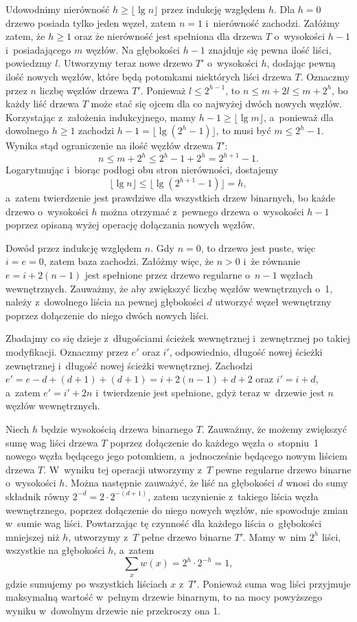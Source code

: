 \exercise %
Udowodnimy nierówność $h\ge\lfloor\lg n\rfloor$ przez indukcję względem $h$. Dla $h=0$ drzewo posiada tylko jeden węzeł, zatem $n=1$ i~nierówność zachodzi. Załóżmy zatem, że $h\ge1$ oraz że nierówność jest spełniona dla drzewa $T$ o~wysokości $h-1$ i~posiadającego $m$ węzłów. Na głębokości $h-1$ znajduje się pewna ilość liści, powiedzmy $l$. Utworzymy teraz nowe drzewo $T'$ o~wysokości $h$, dodając pewną ilość nowych węzłów, które będą potomkami niektórych liści drzewa $T$. Oznaczmy przez $n$ liczbę węzłów drzewa $T'$. Ponieważ $l\le2^{h-1}$, to $n\le m+2l\le m+2^h$, bo każdy liść drzewa $T$ może stać się ojcem dla co najwyżej dwóch nowych węzłów. Korzystając z~założenia indukcyjnego, mamy $h-1\ge\lfloor\lg m\rfloor$, a~ponieważ dla dowolnego $h\ge1$ zachodzi $h-1=\bigl\lfloor\lg(2^h-1)\bigr\rfloor$, to musi być $m\le 2^h-1$. Wynika stąd ograniczenie na ilość węzłów drzewa $T'$:
\[
	n \le m+2^h \le 2^h-1+2^h = 2^{h+1}-1.
\]
Logarytmując i~biorąc podłogi obu stron nierówności, dostajemy
\[
	\lfloor\lg n\rfloor \le \bigl\lfloor\lg(2^{h+1}-1)\bigr\rfloor = h,
\]
a~zatem twierdzenie jest prawdziwe dla wszystkich drzew binarnych, bo każde drzewo o~wysokości $h$ można otrzymać z~pewnego drzewa o~wysokości $h-1$ poprzez opisaną wyżej operację dołączania nowych węzłów.

\exercise %
Dowód przez indukcję względem $n$. Gdy $n=0$, to drzewo jest puste, więc $i=e=0$, zatem baza zachodzi. Załóżmy więc, że $n>0$ i~że równanie $e=i+2(n-1)$ jest spełnione przez drzewo regularne o~$n-1$ węzłach wewnętrznych. Zauważmy, że aby zwiększyć liczbę węzłów wewnętrznych o~1, należy z~dowolnego liścia na pewnej głębokości $d$ utworzyć węzeł wewnętrzny poprzez dołączenie do niego dwóch nowych liści.

Zbadajmy co się dzieje z~długościami ścieżek wewnętrznej i~zewnętrznej po takiej modyfikacji. Oznaczmy przez $e'$ oraz $i'$, odpowiednio, długość nowej ścieżki zewnętrznej i~długość nowej ścieżki wewnętrznej. Zachodzi $e'=e-d+(d+1)+(d+1)=i+2(n-1)+d+2$ oraz $i'=i+d$, a~zatem $e'=i'+2n$ i~twierdzenie jest spełnione, gdyż teraz w~drzewie jest $n$ węzłów wewnętrznych.

\exercise %
Niech $h$ będzie wysokością drzewa binarnego $T$. Zauważmy, że możemy zwiększyć sumę wag liści drzewa $T$ poprzez dołączenie do każdego węzła o~stopniu~1 nowego węzła będącego jego potomkiem, a~jednocześnie będącego nowym liściem drzewa $T$. W~wyniku tej operacji utworzymy z~$T$ pewne regularne drzewo binarne o~wysokości $h$. Można następnie zauważyć, że liść na głębokości $d$ wnosi do sumy składnik równy $2^{-d}=2\cdot2^{-(d+1)}$, zatem uczynienie z~takiego liścia węzła wewnętrznego, poprzez dołączenie do niego nowych węzłów, nie spowoduje zmian w~sumie wag liści. Powtarzając tę czynność dla każdego liścia o~głębokości mniejszej niż $h$, utworzymy z~$T$ pełne drzewo binarne $T'$. Mamy w~nim $2^h$ liści, wszystkie na głębokości $h$, a~zatem
\[
	\sum_{x}w(x) = 2^h\cdot2^{-h} = 1,
\]
gdzie sumujemy po wszystkich liściach $x$ z~$T'$. Ponieważ suma wag liści przyjmuje maksymalną wartość w~pełnym drzewie binarnym, to na mocy powyższego wyniku w~dowolnym drzewie nie przekroczy ona 1.

